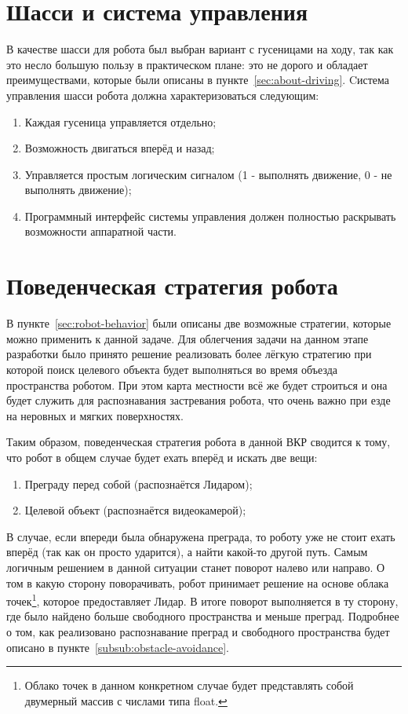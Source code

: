\section{Шасси и система управления}
В качестве шасси для робота был выбран вариант с гусеницами на ходу, так как это несло большую пользу в практическом плане: это не дорого и обладает преимуществами, которые были описаны в пункте~\ref{sec:about-driving}.  
Cистема управления шасси робота должна характеризоваться следующим:
\begin{enumerate}
\item Каждая гусеница управляется отдельно;
\item Возможность двигаться вперёд и назад;
\item Управляется простым логическим сигналом (1 - выполнять движение, 0 - не выполнять движение);
\item Программный интерфейс системы управления должен полностью раскрывать возможности аппаратной части.
\end{enumerate}

\section{Поведенческая стратегия робота}
В пункте~\ref{sec:robot-behavior} были описаны две возможные стратегии, которые можно применить к данной задаче. Для облегчения задачи на данном этапе разработки было принято решение реализовать более лёгкую стратегию при которой поиск целевого объекта будет выполняться во время объезда пространства роботом. При этом карта местности всё же будет строиться и она будет служить для распознавания застревания робота, что очень важно при езде на неровных и мягких поверхностях.

Таким образом, поведенческая стратегия робота в данной ВКР сводится к тому, что робот в общем случае будет ехать вперёд и искать две вещи:
\begin{enumerate}
\item Преграду перед собой (распознаётся Лидаром);
\item Целевой объект (распознаётся видеокамерой);
\end{enumerate} 

В случае, если впереди была обнаружена преграда, то роботу уже не стоит ехать вперёд (так как он просто ударится), а найти какой-то другой путь. Самым логичным решением в данной ситуации станет поворот налево или направо. О том в какую сторону поворачивать, робот принимает решение на основе облака точек\footnote{Облако точек в данном конкретном случае будет представлять собой двумерный массив с числами типа float.}, которое предоставляет Лидар. В итоге поворот выполняется в ту сторону, где было найдено больше свободного пространства и меньше преград. Подробнее о том, как реализовано распознавание преград и свободного пространства будет описано в пункте~\ref{subsub:obstacle-avoidance}.

